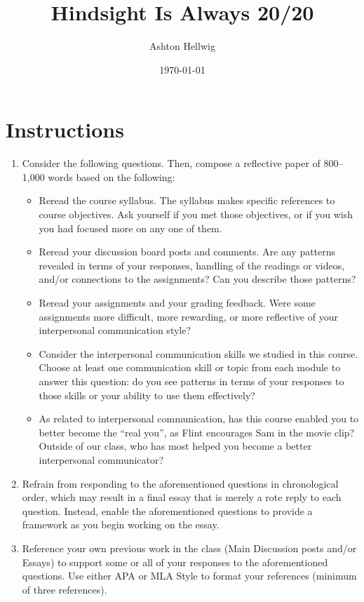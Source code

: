 \documentclass[stu,12pt]{apa7}
\title{%
    Hindsight Is Always 20/20
  }
\author{Ashton Hellwig}
\date{\today}
\begin{document}
  \maketitle


  \section*{Instructions}
    \begin{enumerate}
      \item Consider the following questions. Then, compose a reflective paper
        of 800--1,000 words based on the following:
        \begin{itemize}
          \item Reread the course syllabus. The syllabus makes specific
            references to course objectives. Ask yourself if you met those
            objectives, or if you wish you had focused more on any one of them.
          \item Reread your discussion board posts and comments. Are any
            patterns revealed in terms of your responses, handling of the
            readings or videos, and/or connections to the assignments? Can
            you describe those patterns?
          \item Reread your assignments and your grading feedback. Were some
            assignments more difficult, more rewarding, or more reflective of
            your interpersonal communication style?
          \item Consider the interpersonal communication skills we studied in
            this course. Choose at least one communication skill or topic from
            each module to answer this question: do you see patterns in terms
            of your responses to those skills or your ability to use them
            effectively?
          \item As related to interpersonal communication, has this course
            enabled you to better become the ``real you'', as Flint encourages
            Sam in the movie clip? Outside of our class, who has most helped
            you become a better interpersonal communicator?
        \end{itemize}
      \item Refrain from responding to the aforementioned questions in
        chronological order, which may result in a final essay that is merely
        a rote reply to each question. Instead, enable the aforementioned
        questions to provide a framework as you begin working on the essay.
      \item Reference your own previous work in the class (Main Discussion
        posts and/or Essays) to support some or all of your responses to the
        aforementioned questions.  Use either APA or MLA Style to format your
        references (minimum of three references).
    \end{enumerate}
\end{document}
